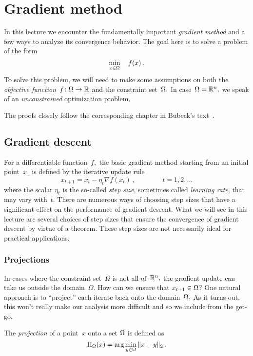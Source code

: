 

\section{Gradient method}

In this lecture we encounter the fundamentally important \emph{gradient method}
and a few ways to analyze its convergence behavior.
The goal here is to solve a problem of the form
\[
\min_{x\in\Omega}\quad f(x)\,.
\]
To solve this problem, we will need to make some assumptions on both the 
\emph{objective function}~$f\colon\Omega\to\mathbb{R}$ and the constraint
set~$\Omega.$ In case~$\Omega=\mathbb{R}^n,$ we speak of an \emph{unconstrained}
optimization problem.

The proofs closely follow the
corresponding chapter in Bubeck's text~\cite{Bubeck}.

\subsection{Gradient descent}

For a differentiable function~$f,$ the basic gradient method starting from an
initial point~$x_1$ is defined by the iterative update rule
\[
x_{t+1} = x_t - \eta_t \nabla f(x_t)\,,\qquad\qquad t=1,2,\dots
\]
where the scalar $\eta_t$ is the so-called \emph{step size}, sometimes called
\emph{learning rate}, that may vary with~$t.$ There are numerous ways of
choosing step sizes that have a significant effect on the performance of
gradient descent. What we will see in this lecture are several choices of step
sizes that ensure the convergence of gradient descent by virtue of a theorem.
These step sizes are not necessarily ideal for practical applications.

\subsubsection{Projections}

In cases where the constraint set~$\Omega$ is not all of~$\mathbb{R}^n,$ the gradient
update can take us outside the domain~$\Omega.$ How can we
ensure that $x_{t+1}\in\Omega$?  One natural approach is to ``project'' each
iterate back onto the domain~$\Omega.$ As it turns out, this won't really make
our analysis more difficult and so we include from the get-go.

\begin{definition}[Projection]
The \emph{projection} of a point~$x$ onto a set $\Omega$ is defined as
\[
\Pi_{\Omega}(x) = \arg\min_{y\in\Omega} \|x-y\|_2\,.
\]
\end{definition}


